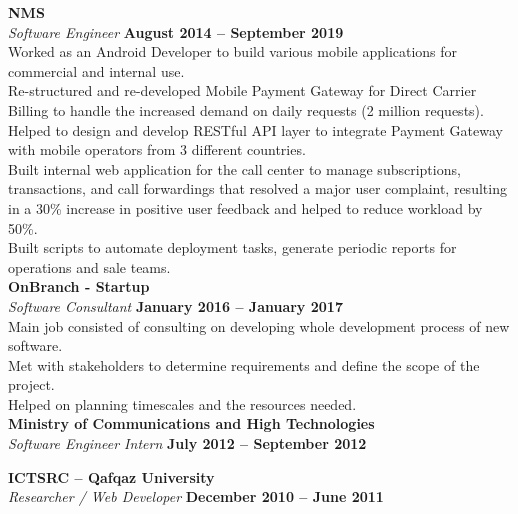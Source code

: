 \documentclass[margin,line]{resume}
\begin{document}
\begin{resume}
    \textbf{\listing NMS} \vspace{2mm}\\\vspace{1mm}%
    \textsl{Software Engineer} \hfill \textbf{August 2014 -- September 2019}\\
    Worked as an Android Developer to build various mobile applications for commercial and internal use.\\ 
Re-structured and re-developed Mobile Payment Gateway for Direct Carrier Billing to handle the increased demand on daily requests (2 million requests).\\
Helped to design and develop RESTful API layer to integrate Payment Gateway with mobile operators from 3 different countries.\\ 
Built internal web application for the call center to manage subscriptions, transactions, and call forwardings that resolved a major user complaint, resulting in a 30\% increase in positive user feedback and helped to reduce workload by 50\%.\\ 
Built scripts to automate deployment tasks, generate periodic reports for operations and sale teams.\\


    \textbf{\listing OnBranch - Startup} \vspace{2mm}\\\vspace{1mm}%
    \textsl{Software Consultant} \hfill \textbf{January 2016 -- January 2017}\\
   Main job consisted of consulting on developing whole development process of new software.\\
Met with stakeholders to determine requirements and define the scope of the project.\\
Helped on planning timescales and the resources needed.\\


    \textbf{\listing Ministry of Communications and High Technologies} \vspace{2mm}\\\vspace{1mm}%
    \textsl{Software Engineer Intern} \hfill \textbf{July 2012 -- September 2012}

    \textbf{\listing ICTSRC – Qafqaz University} \vspace{2mm}\\\vspace{1mm}%
    \textsl{Researcher / Web Developer} \hfill \textbf{December 2010 -- June 2011}


\end{resume}
\end{document}
